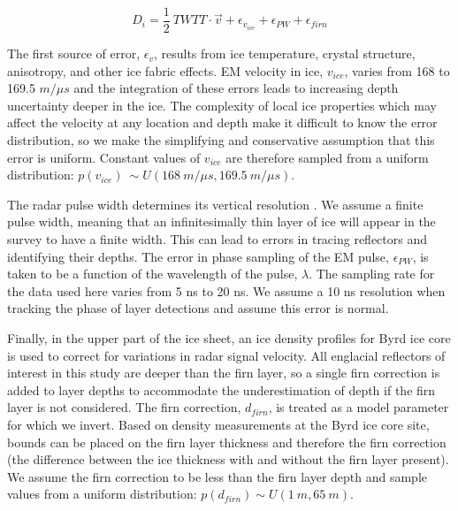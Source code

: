 \begin{equation}\label{deptheqn}
D_i = \frac{1}{2}~TWTT \cdot \vec{v} + \epsilon_{v_{ice}} + \epsilon_{PW} + \epsilon_{firn}
\end{equation}

The first source of error, $\epsilon_{v}$, results from ice temperature, crystal structure, anisotropy, and other ice fabric effects. EM velocity in ice, $v_{ice}$, varies from 168 to 169.5 $m/{\mu}s$ \citep{fujita2000} and the integration of these errors leads to increasing depth uncertainty deeper in the ice.  The complexity of local ice properties which may affect the velocity at any location and depth make it difficult to know the error distribution, so we make the simplifying and conservative assumption that this error is uniform. Constant values of $v_{ice}$ are therefore sampled from a uniform distribution: $p(v_{ice}) ~\sim U(168~m/{\mu}s,169.5~m/{\mu}s)$.

The radar pulse width determines its vertical resolution \citep{millar1982}. We assume a finite pulse width, meaning that an infinitesimally thin layer of ice will appear in the survey to have a finite width. This can lead to errors in tracing reflectors and identifying their depths. The error in phase sampling of the EM pulse, $\epsilon_{PW}$, is taken to be a function of the wavelength of the pulse, $\lambda$. The sampling rate for the data used here varies from 5 ns to 20 ns. We assume a 10 ns resolution when tracking the phase of layer detections and assume this error is normal.

Finally, in the upper part of the ice sheet, an ice density profiles for %
Byrd \citep{gow1968} ice core is used to correct for variations in radar signal velocity. All englacial reflectors of interest in this study are deeper than the firn layer, so a single firn correction is added to layer depths to accommodate the underestimation of depth if the firn layer is not considered. The firn correction, $d_{firn}$, is treated as a model parameter for which we invert. Based on density measurements at the Byrd ice core site, bounds can be placed on the firn layer thickness and therefore the firn correction (the difference between the ice thickness with and without the firn layer present). We assume the firn correction to be less than the firn layer depth and sample values from a uniform distribution: $p(d_{firn}) \sim U(1~m, 65~m)$. %

